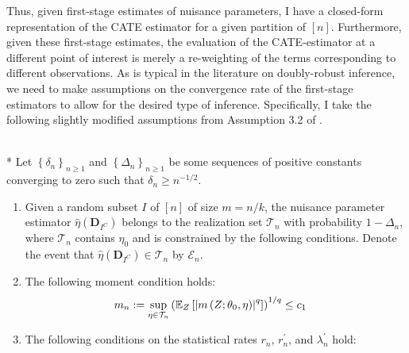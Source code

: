 Thus, given first-stage estimates of nuisance parameters, I have a closed-form representation of the CATE estimator for a given partition of $[n]$.
Furthermore, given these first-stage estimates, the evaluation of the CATE-estimator at a different point of interest is merely a re-weighting of the terms corresponding to different observations.
As is typical in the literature on doubly-robust inference, we need to make assumptions on the convergence rate of the first-stage estimators to allow for the desired type of inference.
Specifically, I take the following slightly modified assumptions from Assumption 3.2 of \citet{chernozhukov_doubledebiased_2018}. 
\begin{boxD}
    \begin{asm}\label{asm:DDML_Rate_Cond}\mbox{}\\*
        Let $\left\{\delta_n\right\}_{n \geq 1}$ and $\left\{\Delta_n\right\}_{n \geq 1}$ be some sequences of positive constants converging to zero such that $\delta_n \geq n^{-1 / 2}$. 
        \begin{enumerate}
            \item Given a random subset $I$ of $[n]$ of size $m = n/k$, the nuisance parameter estimator $\hat{\eta}\left(\mathbf{D}_{I^{C}}\right)$ belongs to the realization set $\mathcal{T}_{n}$ with probability $1 - \Delta_{n}$, where $\mathcal{T}_{n}$ contains $\eta_{0}$ and is constrained by the following conditions. 
            Denote the event that $\hat{\eta}\left(\mathbf{D}_{I^{C}}\right) \in \mathcal{T}_{n}$ by $\mathcal{E}_{n}$.
            \item The following moment condition holds:
            \begin{align}
                m_{n} 
                & :=\sup_{\eta \in \mathcal{T}_{n}}\left(\mathbb{E}_{Z}\left[\left|m\left(Z; \theta_0, \eta\right)\right|^q\right]\right)^{1 / q}
                \leq c_1
            \end{align}
            \item The following conditions on the statistical rates $r_{n}$, $r_{n}^{\prime}$, and $\lambda_{n}^{\prime}$ hold:
            \begin{align}

\end{align}
\end{enumerate}
\end{asm}
\end{boxD}
